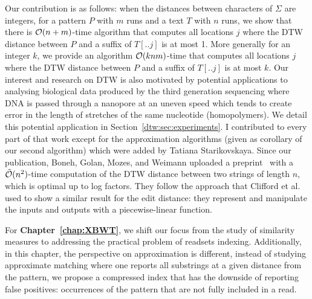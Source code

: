 Our contribution is as follows: when the distances between characters of $\Sigma$ are integers, for a pattern $P$ with $m$ runs and a text $T$ with $n$ runs, we show that there is $\mathcal{O}(n+m)$-time algorithm that computes all locations $j$ where the DTW distance between $P$ and a suffix of $T[..j]$ is at most 1. More generally for an integer $k$, we provide an algorithm $\mathcal{O}(knm)$-time that computes all locations $j$ where the DTW distance between $P$ and a suffix of $T[..j]$ is at most $k$.
Our interest and research on DTW is also motivated by potential applications to analysing biological data produced by the third generation sequencing where DNA is passed through a nanopore at an uneven speed which tends to create error in the length of stretches of the same nucleotide (homopolymers). We detail this potential application in Section~\ref{dtw:sec:experiments}.
I contributed to every part of that work except for the approximation algorithms (given as corollary of our second algorithm) which were added by Tatiana Starikovskaya.
Since our publication, Boneh, Golan, Mozes, and Weimann uploaded a preprint~\cite{boneh2023near} with a $\tilde{\mathcal{O}}(n^2)$-time computation of the DTW distance between two strings of length $n$, which is optimal up to log factors. They follow the approach that Clifford et al.~\cite{clifford2019rle} used to show a similar result for the edit distance: they represent and manipulate the inputs and outputs with a piecewise-linear function.



For \textbf{Chapter~\ref{chap:XBWT}}, we shift our focus from the study of similarity measures to addressing the practical problem of readsets indexing. 
Additionally, in this chapter, the perspective on approximation is different, instead of studying approximate matching where one reports all substrings at a given distance from the pattern, we propose a compressed index that has the downside of reporting false positives: occurrences of the pattern that are not fully included in a read.

